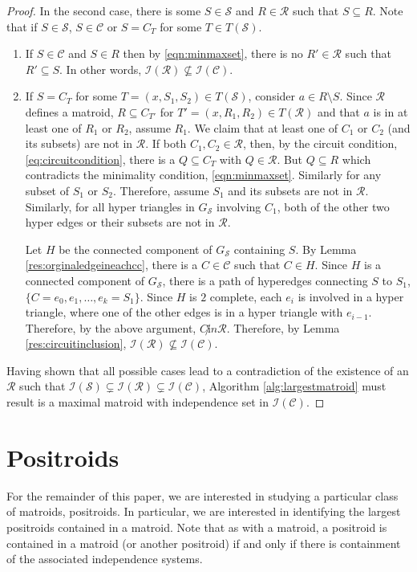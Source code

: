 \documentclass[11pt]{article}
\newcommand{\sI}{\mathscr{I}}
\newcommand{\sC}{\mathscr{C}}
\newcommand{\sR}{\mathscr{R}}
\newcommand{\sS}{\mathscr{S}}
\theoremstyle{remark}
\theoremstyle{definition}
\begin{document}
\begin{proof}
    In the second case, there is some $S \in \sS$ and $R \in \sR$ such that $S \subseteq R$. Note that if $S \in \sS$, $S \in \sC$ or $S = C_T$ for some $T \in T(\sS)$. 
    \begin{enumerate} 
    \item If $S \in \sC$ and $S \in R$ then by \eqref{eqn:minmaxset}, there is no $R' \in \sR$ such that $R' \subseteq S$. In other words, $\sI(\sR) \not \subseteq \sI(\sC)$. 
    \item If $S = C_T$ for some $T = (x, S_1, S_2) \in T(\sS)$, consider $a \in R \setminus S$. Since $\sR$ defines a matroid, $R \subseteq C_{T'}$ for $T' = (x, R_1, R_2) \in T(\sR)$ and that $a$ is in at least one of $R_1$ or $R_2$, assume $R_1$. We claim that at least one of $C_1$ or $C_2$ (and its subsets) are not in $\sR$. If both $C_1, C_2 \in \sR$, then, by the circuit condition, \eqref{eq:circuitcondition}, there is a  $Q \subseteq C_T$ with $Q \in \sR$. But $Q \subseteq R$ which contradicts the minimality condition, \eqref{eqn:minmaxset}. Similarly for any subset of $S_1$ or $S_2$. Therefore, assume $S_1$ and its subsets are  not in $\sR$. Similarly, for all hyper triangles in $G_\sS$ involving $C_1$, both of the other two hyper edges or their subsets are not in $\sR$.
    
    Let $H$ be the connected component of $G_\sS$ containing $S$.  By Lemma \ref{res:orginaledgeineachcc}, there is a $C \in \sC$ such that $C \in H$. Since $H$ is a connected component of $G_\sS$, there is a path of hyperedges connecting $S$ to $S_1$, $\{C = e_0, e_1, \ldots, e_k = S_1 \}$. Since $H$ is $2$ complete, each $e_i$ is involved in a hyper triangle, where one of the other edges is in a hyper triangle with $e_{i-1}$. Therefore, by the above argument, $C \not in \sR$. Therefore, by Lemma \ref{res:circuitinclusion}, $\sI(\sR) \not \subseteq \sI(\sC)$. 
    \end{enumerate}
Having shown that all possible cases lead to a contradiction of the existence of  an $\sR$ such that $\sI(\sS) \subsetneq \sI(\sR) \subsetneq \sI(\sC)$, Algorithm \ref{alg:largestmatroid} must result is a maximal matroid with independence set in $\sI(\sC)$.
\end{proof}

\section{Positroids}
For the remainder of this paper, we are interested in studying a particular class of matroids, positroids. In particular, we are interested in identifying the largest positroids contained in a matroid. Note that as with a matroid, a positroid is contained in a matroid (or another positroid) if and only if there is containment of the associated independence systems. 
\end{document}
